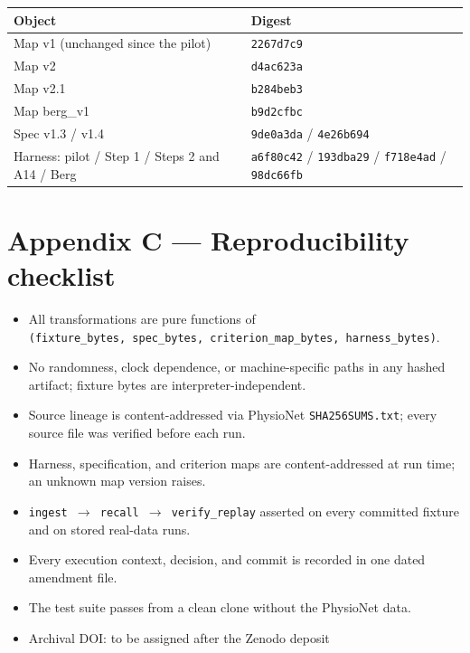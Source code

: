 \documentclass[11pt]{article}
\providecommand{\tightlist}{\setlength{\itemsep}{0pt}\setlength{\parskip}{0pt}}
\begin{document}
\begin{longtable}[]{@{}
  >{\raggedright\arraybackslash}p{}
  >{\raggedright\arraybackslash}p{}@{}}
\toprule\noalign{}
\begin{minipage}[b]{\linewidth}\raggedright
Object
\end{minipage} & \begin{minipage}[b]{\linewidth}\raggedright
Digest
\end{minipage} \\
\midrule\noalign{}
\endhead
\bottomrule\noalign{}
\endlastfoot
Map v1 (unchanged since the pilot) & \texttt{2267d7c9} \\
Map v2 & \texttt{d4ac623a} \\
Map v2.1 & \texttt{b284beb3} \\
Map berg\_v1 & \texttt{b9d2cfbc} \\
Spec v1.3 / v1.4 & \texttt{9de0a3da} / \texttt{4e26b694} \\
Harness: pilot / Step 1 / Steps 2 and A14 / Berg & \texttt{a6f80c42} / \texttt{193dba29} / \texttt{f718e4ad} / \texttt{98dc66fb} \\
\end{longtable}

\section{Appendix C --- Reproducibility checklist}\label{appendix-c-reproducibility-checklist}

\begin{itemize}
\tightlist
\item[$\boxtimes$]
  All transformations are pure functions of \texttt{(fixture\_bytes,\ spec\_bytes,\ criterion\_map\_bytes,\ harness\_bytes)}.
\item[$\boxtimes$]
  No randomness, clock dependence, or machine-specific paths in any hashed artifact; fixture bytes are interpreter-independent.
\item[$\boxtimes$]
  Source lineage is content-addressed via PhysioNet \texttt{SHA256SUMS.txt}; every source file was verified before each run.
\item[$\boxtimes$]
  Harness, specification, and criterion maps are content-addressed at run time; an unknown map version raises.
\item[$\boxtimes$]
  \texttt{ingest\ $\rightarrow$\ recall\ $\rightarrow$\ verify\_replay} asserted on every committed fixture and on stored real-data runs.
\item[$\boxtimes$]
  Every execution context, decision, and commit is recorded in one dated amendment file.
\item[$\boxtimes$]
  The test suite passes from a clean clone without the PhysioNet data.
\item[$\square$]
  Archival DOI: to be assigned after the Zenodo deposit
\end{itemize}




\end{document}
